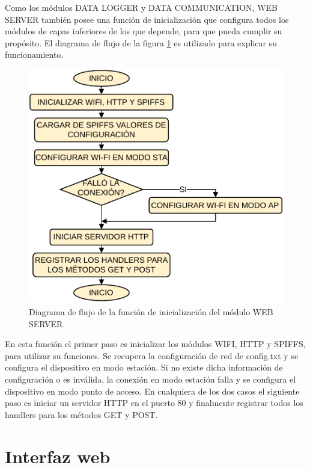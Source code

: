 Como los módulos DATA LOGGER y DATA COMMUNICATION, WEB SERVER también posee una función de inicialización que configura todos los módulos de capas inferiores de los que depende, para que pueda cumplir su propósito. El diagrama de flujo de la figura \ref{fig:serverInit} es utilizado para explicar su funcionamiento.

\begin{figure}[h]
	\centering
	\includegraphics[scale=1]{./Figures/web_server_init.pdf}
	\caption{Diagrama de flujo de la función de inicialización del módulo WEB SERVER.}
		\label{fig:serverInit}
\end{figure}

En esta función el primer paso es inicializar los módulos WIFI, HTTP y SPIFFS, para utilizar su funciones. Se recupera la configuración de red de config.txt y se configura el dispositivo en modo estación. Si no existe dicha información de configuración o es inválida, la conexión en modo estación falla y se configura el dispositivo en modo punto de acceso. En cualquiera de los dos casos el siguiente paso es iniciar un servidor HTTP en el puerto 80 y finalmente registrar todos los handlers para los métodos GET y POST.


\section{Interfaz web}

